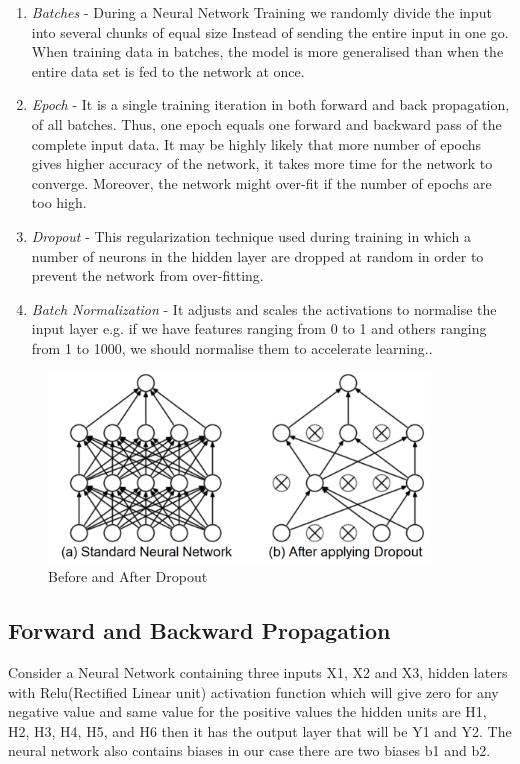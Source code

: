 \begin{enumerate}
    \item \textit{Batches} - During a Neural Network Training we randomly divide the input into several chunks of equal size Instead of sending the entire input in one go. When training data in batches, the model is more generalised than when the entire data set is fed to the network at once.
    \item \textit{Epoch} - It is a single training iteration in both forward and back propagation, of all batches. Thus, one epoch equals one forward and backward pass of the complete input data. It may be highly likely that more number of epochs gives higher accuracy of the network, it takes more time for the network to converge. Moreover, the network might over-fit if the number of epochs are too high.
    \item \textit{Dropout} - This regularization technique used during training in which a number of neurons in the hidden layer are dropped at random in order to prevent the network from over-fitting.
    \item \textit{Batch Normalization} - It adjusts and scales the activations to normalise the input layer e.g. if we have features ranging from 0 to 1 and others ranging from 1 to 1000, we should normalise them to accelerate learning..
\end{enumerate}

\begin{figure}[h!]
    \centering
    \includegraphics[width=0.9\textwidth]{img/dropout.png}
    \caption{Before and After Dropout}
    \label{fig:droupout}
\end{figure}

\subsection{Forward and Backward Propagation}
Consider a Neural Network containing three inputs X1, X2 and X3, hidden laters with Relu(Rectified Linear unit) activation function which will give zero for any negative value and same value for the positive values the hidden units are H1, H2, H3, H4, H5, and H6 then it has the output layer that will be Y1 and Y2. The neural network also contains biases in our case there are two biases b1 and b2.

